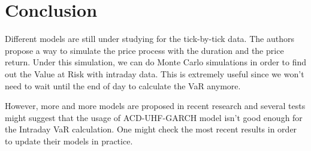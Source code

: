 \documentclass[12pt, a4paper]{article}
\begin{document}

\section{Conclusion}
Different models are still under studying for the tick-by-tick data. The authors propose a way to simulate the price process with the duration and the price return. Under this simulation, we can do Monte Carlo simulations in order to find out the Value at Risk with intraday data. This is extremely useful since we won't need to wait until the end of day to calculate the VaR anymore.

However, more and more models are proposed in recent research and several tests might suggest that the usage of ACD-UHF-GARCH model isn't good enough for the Intraday VaR calculation. One might check the most recent results in order to update their models in practice.

\newpage


\end{document}
